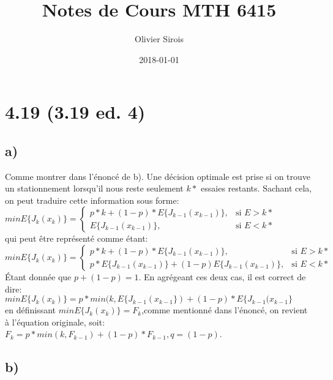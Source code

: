 \documentclass[oneside]{book}
\title{Notes de Cours MTH 6415}
\date{2018-01-01}
\author{Olivier Sirois}
\begin{document}
\setcounter{page}{1}
\maketitle
\section*{4.19 (3.19 ed. 4)}
\subsection*{a)}
Comme montrer dans l'énoncé de b). Une décision optimale est prise si on trouve un stationnement lorsqu'il nous reste seulement $k*$ essaies restants. Sachant cela, on peut traduire cette information sous forme:\\


\begin{math}
min E \{ J_k(x_k) \} = 
\begin{cases}
p*k + (1-p)*E\{J_{k-1}(x_{k-1})\}, & \text{si } E > k*\\
E\{J_{k-1}(x_{k-1})\}, & \text{si } E < k*
\end{cases}
\end{math}\\


qui peut être représenté comme étant:\\

\begin{math}
min E \{ J_k(x_k) \} = 
\begin{cases}
p*k + (1-p)*E\{J_{k-1}(x_{k-1})\}, & \text{si } E > k*\\
p*E\{J_{k-1}(x_{k-1})\} + (1-p)E\{J_{k-1}(x_{k-1})\}, & \text{si } E < k*
\end{cases}
\end{math}\\

Étant donnée que $p + (1-p) = 1$. En agrégeant ces deux cas, il est correct de dire:\\

$min E \{ J_k(x_k) \} = p*min(k,E\{J_{k-1}(x_{k-1}\}) + (1-p)*E\{J_{k-1}(x_{k-1}\}$\\

en définissant $minE\{J_k(x_k)\} = F_k$,comme mentionné dans l'énoncé, on revient à l'équation originale, soit:\\

$F_k = p*min(k, F_{k-1}) + (1-p)*F_{k-1}, q = (1-p)$.

\subsection*{b)}
\end{document}
